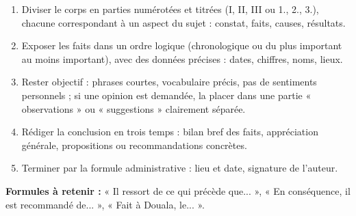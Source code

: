 \documentclass[11pt]{article}
\newcommand{\cle}[1]{{\popxbold\color{popdark}#1}}
\begin{document}
\begin{methode}
\begin{enumerate}
\item \cle{Diviser} le corps en parties numérotées et titrées (I, II, III ou 1., 2., 3.), chacune correspondant à un aspect du sujet : constat, faits, causes, résultats.
\item \cle{Exposer les faits} dans un ordre logique (chronologique ou du plus important au moins important), avec des données précises : dates, chiffres, noms, lieux.
\item \cle{Rester objectif} : phrases courtes, vocabulaire précis, pas de sentiments personnels ; si une opinion est demandée, la placer dans une partie « observations » ou « suggestions » clairement séparée.
\item \cle{Rédiger la conclusion} en trois temps : bilan bref des faits, appréciation générale, propositions ou recommandations concrètes.
\item \cle{Terminer} par la formule administrative : lieu et date, signature de l'auteur.
\end{enumerate}
\textbf{Formules à retenir :} « Il ressort de ce qui précède que... », « En conséquence, il est recommandé de... », « Fait à Douala, le... ».
\end{methode}
\end{document}
